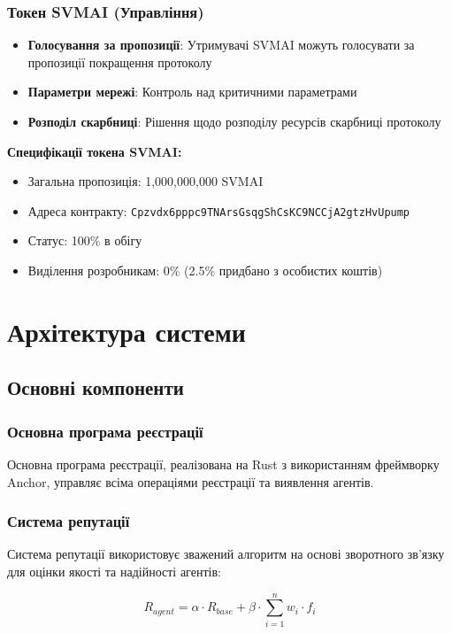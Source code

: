 \documentclass[12pt,a4paper]{article}
\begin{document}
\subsubsection{Токен SVMAI (Управління)}
\begin{itemize}
\item \textbf{Голосування за пропозиції}: Утримувачі SVMAI можуть голосувати за пропозиції покращення протоколу
\item \textbf{Параметри мережі}: Контроль над критичними параметрами
\item \textbf{Розподіл скарбниці}: Рішення щодо розподілу ресурсів скарбниці протоколу
\end{itemize}

\textbf{Специфікації токена SVMAI:}
\begin{itemize}
\item Загальна пропозиція: 1,000,000,000 SVMAI
\item Адреса контракту: \texttt{Cpzvdx6pppc9TNArsGsqgShCsKC9NCCjA2gtzHvUpump}
\item Статус: 100\% в обігу
\item Виділення розробникам: 0\% (2.5\% придбано з особистих коштів)
\end{itemize}

\section{Архітектура системи}

\subsection{Основні компоненти}

\subsubsection{Основна програма реєстрації}

Основна програма реєстрації, реалізована на Rust з використанням фреймворку Anchor, управляє всіма операціями реєстрації та виявлення агентів.

\subsubsection{Система репутації}

Система репутації використовує зважений алгоритм на основі зворотного зв'язку для оцінки якості та надійності агентів:

\begin{equation}
R_{agent} = \alpha \cdot R_{base} + \beta \cdot \sum_{i=1}^{n} w_i \cdot f_i
\end{equation}
\end{document}
